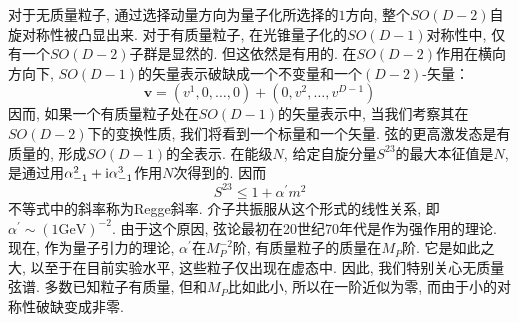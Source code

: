 对于无质量粒子, 通过选择动量方向为量子化所选择的$1$方向, 整个$SO(D-2)$自旋对称性被凸显出来. 
对于有质量粒子, 在光锥量子化的$SO(D-1)$对称性中, 仅有一个$SO(D-2)$子群是显然的. 但这依然是有用的. 
在$SO(D-2)$作用在横向方向下, $SO(D-1)$的矢量表示破缺成一个不变量和一个$(D-2)$-矢量：
\begin{equation}
\mathbf{v}=\left(v^{1}, 0, \ldots, 0\right)+\left(0, v^{2}, \ldots, v^{D-1}\right)
\end{equation}
因而, 如果一个有质量粒子处在$SO(D-1)$的矢量表示中, 当我们考察其在$SO(D-2)$下的变换性质, 我们将看到一个标量和一个矢量. 弦的更高激发态是有质量的, 形成$SO(D-1)$的全表示. 
在能级$N$, 给定自旋分量$S^{23}$的最大本征值是$N$, 是通过用$\alpha_{-1}^{2}+\mathrm{i} \alpha_{-1}^{3}$作用$N$次得到的. 
因而
\begin{equation}
S^{23} \leq 1+\alpha^{\prime} m^{2}
\end{equation}
不等式中的斜率称为Regge斜率. 介子共振服从这个形式的线性关系, 即$\alpha^{\prime} \sim(1 \mathrm{GeV})^{-2}$. 由于这个原因, 弦论最初在20世纪70年代是作为强作用的理论. 现在, 作为量子引力的理论, $\alpha^\prime$在$M_P^{-2}$阶, 有质量粒子的质量在$M_P$阶. 它是如此之大, 以至于在目前实验水平, 这些粒子仅出现在虚态中. 因此, 我们特别关心无质量弦谱. 
多数已知粒子有质量, 但和$M_P$比如此小, 所以在一阶近似为零, 而由于小的对称性破缺变成非零. 

